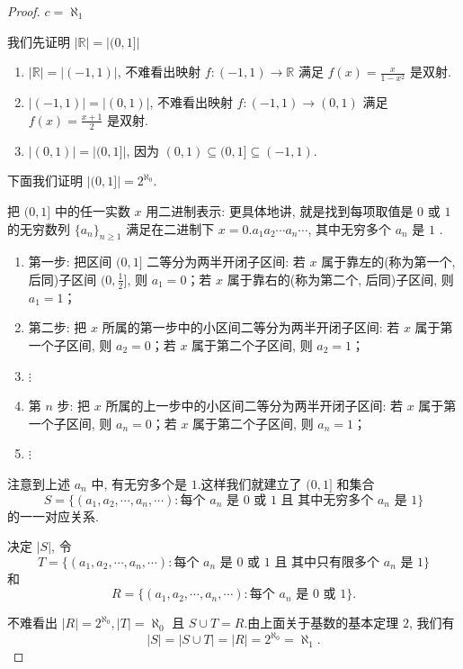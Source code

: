 \documentclass[cn,toc=twocol]{elegantbook}
\newcommand{\ITEMS}{\begin{enumerate}}
\newcommand{\ITEME}{\end{enumerate}}
\newcommand{\R}{\mathbb{R}}
\begin{document}
\begin{proof} $c = \aleph_1$

我们先证明 $\lvert \R \rvert=\lvert (0, 1]\rvert $
\smallskip
\ITEMS
\item $\lvert \R\rvert =\lvert (-1, 1)\rvert $, 不难看出映射  $f:(-1, 1)\rightarrow \R$ 满足 $f(x)=\frac {x}{1-x^2}$ 是双射.

\item $\lvert (-1, 1)\rvert=\lvert (0, 1)\rvert $, 不难看出映射  $f:(-1, 1)\rightarrow (0, 1) $ 满足 $f(x)=\frac {x+1}{2}$ 是双射.

\item $\lvert (0, 1)\rvert=\lvert (0, 1]\rvert $, 因为 $(0, 1)\subseteq (0, 1]\subseteq (-1, 1)$.
\ITEME

\smallskip
下面我们证明 $\lvert (0, 1]\rvert=2^{\aleph_0}$.

把 $(0, 1]$ 中的任一实数 $x$ 用二进制表示: 更具体地讲, 就是找到每项取值是 $0$ 或 $1$ 的无穷数列 $\{a_n\}_{n \ge 1}$ 满足在二进制下 $x=0.a_1 a_2\cdots a_n \cdots$, 其中无穷多个 $a_n$ 是 $1$ .
\ITEMS 
	\item 第一步: 把区间 $(0, 1]$ 二等分为两半开闭子区间: 若 $x$ 属于靠左的(称为第一个, 后同)子区间 $(0, \frac{1}{2}]$, 则 $a_1=0$；若 $x$ 属于靠右的(称为第二个, 后同)子区间, 则 $a_1=1$；
	
	\item 第二步: 把 $x$ 所属的第一步中的小区间二等分为两半开闭子区间:  若 $x$ 属于第一个子区间, 则 $a_2=0$；若 $x$ 属于第二个子区间, 则 $a_2=1$；
	\item $\vdots$ 
	\item 第 $n$ 步:  把 $x$ 所属的上一步中的小区间二等分为两半开闭子区间:  若 $x$ 属于第一个子区间, 则 $a_n=0$；若 $x$ 属于第二个子区间, 则 $a_n=1$；
	\item $\vdots$
\ITEME

注意到上述 $a_n$ 中, 有无穷多个是 $1$.这样我们就建立了 $(0, 1]$ 和集合 
\[
    S=\{(a_1,  a_2, \cdots,  a_n,  \cdots): \mbox{每个 $a_n$ 是 $0$ 或 $1$ 且 其中无穷多个 $a_n$ 是 $1$} \}
\] 
的一一对应关系.

决定 $\lvert S\rvert$, 令 
\[
	T=\{(a_1,  a_2, \cdots,  a_n,  \cdots): \mbox{每个 $a_n$ 是 $0$ 或 $1$ 且 其中只有限多个 $a_n$ 是 $1$} \}
\] 
和 
\[
	R=\{(a_1,  a_2, \cdots,  a_n,  \cdots): \mbox{每个 $a_n$ 是 $0$ 或 $1$}\}.
\]

不难看出 $\lvert R\rvert=2^{\aleph_0},  \lvert T\rvert=\aleph_0$ 且 $S\cup T= R$.由上面关于基数的基本定理 $2$, 我们有 
\[
	\lvert S\rvert=\lvert S\cup T\rvert =\lvert R\rvert=2^{\aleph_0}=\aleph_1.
\]
\end{proof}
\smallskip
\end{document}
